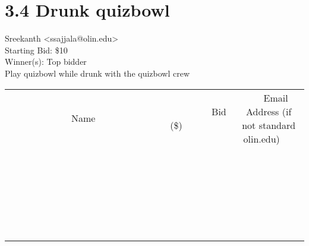 \documentclass[11pt]{article}
\begin{document}
					\section*{3.4 Drunk quizbowl}
					Sreekanth <ssajjala@olin.edu> \\
					Starting Bid: \$10 \\
					Winner(s): Top bidder \\
					Play quizbowl while drunk with the quizbowl crew \\
					[6ex]
					\begin{tabular}{c c c}
						~~~~~~~~~~~~~Name~~~~~~~~~~~~~ & ~~~~~~~~~Bid (\$)~~~~~~~~~ & ~~~Email Address (if not standard olin.edu)~~~ \\
				
 & & \\
\hline
 & & \\
\hline
 & & \\
\hline
 & & \\
\hline
 & & \\
\hline
 & & \\
\hline
 & & \\
\hline
 & & \\
\hline
 & & \\
\hline
 & & \\
\hline
 & & \\
\hline
 & & \\
\hline
 & & \\
\hline
 & & \\
\hline
 & & \\
\hline
 & & \\
\hline
 & & \\
\hline
 & & \\
\hline
 & & \\
\hline
 & & \\
\hline
 & & \\
\hline
 & & \\
\hline
 & & \\
\hline
 & & \\
\hline
 & & \\
\hline
 & & \\
\hline
					\end{tabular}
					\clearpage
				
\end{document}

